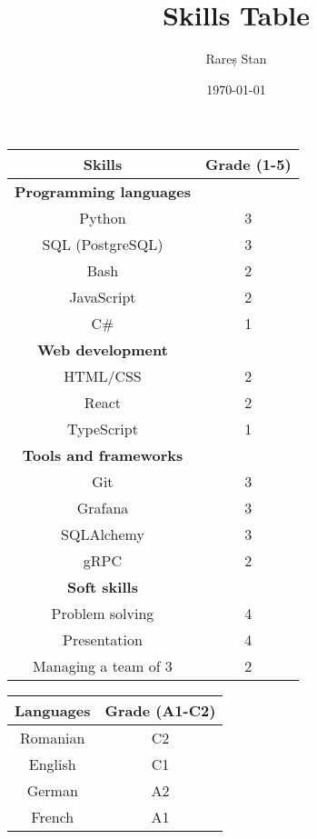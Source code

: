 \documentclass{article}
\begin{document}
	
	\title{Skills Table}
	\author{Rareș Stan}
	\date{\today}
	\maketitle
	\thispagestyle{empty}
	
	\begin{table}[h]
		\centering
		\begin{tabularx}{\textwidth}{|C|C|}
			\hline
			\textbf{\large Skills} & \textbf{\large Grade (1-5)} \\
			\hline\hline
			\textbf{Programming languages} &  \\
			\hline
			Python & 3 \\
			\hline
			SQL (PostgreSQL) & 3 \\
			\hline
			Bash & 2 \\
			\hline
			JavaScript & 2 \\
			\hline
			C\# & 1 \\
			\hline\hline
			\textbf{Web development} &  \\
			\hline
			HTML/CSS & 2 \\
			\hline
			React & 2 \\
			\hline
			TypeScript & 1 \\
			\hline\hline
			\textbf{Tools and frameworks} &  \\
			\hline
			Git & 3 \\
			\hline
			Grafana & 3 \\
			\hline
			SQLAlchemy & 3 \\
			\hline
			gRPC & 2 \\
			\hline\hline
			\textbf{Soft skills} &  \\
			\hline
			Problem solving & 4 \\
			\hline
			Presentation & 4 \\
			\hline
			Managing a team of 3 & 2 \\
			\hline
		\end{tabularx}
	\vskip 10mm
		\begin{tabularx}{\textwidth}{|C|C|}
			\hline
			\textbf{\large Languages} & \textbf{\large Grade (A1-C2)} \\
			\hline
			Romanian & C2 \\
			\hline
			English & C1 \\
			\hline
			German & A2 \\
			\hline
			French & A1 \\
			\hline
		\end{tabularx}
	\end{table}
	
\end{document}
